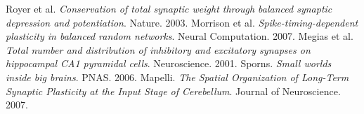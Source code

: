 \documentclass{ucetd}
\begin{document}
\newline
\noindent [43] Royer et al. \textit{Conservation of total synaptic weight through balanced synaptic depression and potentiation}. Nature. 2003.
\newline
\noindent [44] Morrison et al. \textit{Spike-timing-dependent plasticity in balanced random networks}. Neural Computation. 2007.
\newline
\noindent [45] Megias et al. \textit{Total number and distribution of inhibitory and excitatory synapses on hippocampal CA1 pyramidal cells}. Neuroscience. 2001.
\newline
\noindent [46] Sporns. \textit{Small worlds inside big brains}. PNAS. 2006.
\newline
\noindent [47] Mapelli. \textit{The Spatial Organization of Long-Term Synaptic Plasticity at the Input Stage of Cerebellum}. Journal of Neuroscience. 2007.
\newline
\end{document}
